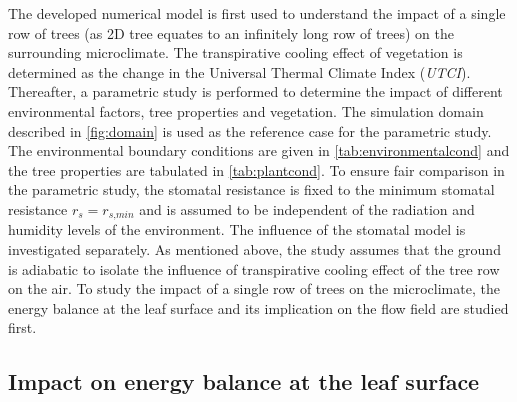 The developed numerical model is first used to understand the impact of a single row of trees (as 2D tree equates to an infinitely long row of trees) on the surrounding microclimate. The transpirative cooling effect of vegetation is determined as the change in the Universal Thermal Climate Index (\textit{UTCI}). Thereafter, a parametric study is performed to determine the impact of different environmental factors, tree properties and vegetation. The simulation domain described in \cref{fig:domain} is used as the reference case for the parametric study. The environmental boundary conditions are given in \cref{tab:environmentalcond} and the tree properties are tabulated in \cref{tab:plantcond}. To ensure fair comparison in the parametric study, the stomatal resistance is fixed to the minimum stomatal resistance $r_s=r_{\textit{s,min}}$ and is assumed to be independent of the radiation and humidity levels of the environment. The influence of the stomatal model is investigated separately. As mentioned above, the study assumes that the ground is adiabatic to isolate the influence of transpirative cooling effect of the tree row on the air. To study the impact of a single row of trees on the microclimate, the energy balance at the leaf surface and its implication on the flow field are studied first.

\subsection{Impact on energy balance at the leaf surface}

